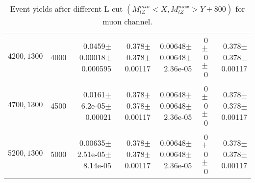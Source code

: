 \documentclass[]{article}
\begin{document}
\begin{table}
\begin{center}
{\begin{tabular}{ |r|r|r|r|r|r|r|}
$4200,1300$ & 4000 & 0.0459$\pm$0.00018$\pm$0.000595 & 0.378$\pm$0.378$\pm$0.00117 & 0.00648$\pm$0.00648$\pm$2.36e-05 & 0$\pm$0$\pm$0 & 0.378$\pm$0.378$\pm$0.00117 \\
$4700,1300$ & 4500 & 0.0161$\pm$6.2e-05$\pm$0.00021 & 0.378$\pm$0.378$\pm$0.00117 & 0.00648$\pm$0.00648$\pm$2.36e-05 & 0$\pm$0$\pm$0 & 0.378$\pm$0.378$\pm$0.00117 \\
$5200,1300$ & 5000 & 0.00635$\pm$2.51e-05$\pm$8.14e-05 & 0.378$\pm$0.378$\pm$0.00117 & 0.00648$\pm$0.00648$\pm$2.36e-05 & 0$\pm$0$\pm$0 & 0.378$\pm$0.378$\pm$0.00117 \\
\hline 
\end{tabular}
}
\end{center}
\caption{Event yields after different L-cut $(M_{lZ}^{min} < X, M_{lZ}^{max} > Y + 800)$ for muon channel.}
\end{table}
\end{document}
